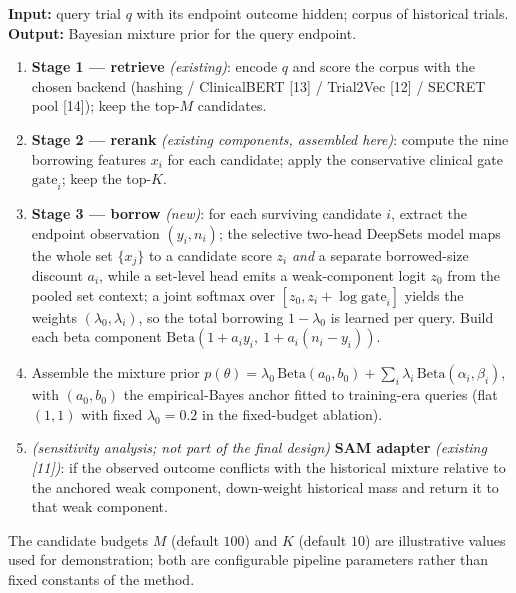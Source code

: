 \documentclass[11pt]{article}
\newcommand{\lamz}{\lambda_{0}}
\begin{document}
\begin{algorithm}[htbp]
\caption{Retrieve $\rightarrow$ rerank $\rightarrow$ borrow. Steps marked
(existing) reuse published tools; the step marked (new) is this paper's core
contribution.}
\label{alg:pipeline}
\small
\textbf{Input:} query trial $q$ with its endpoint outcome hidden; corpus of
historical trials. \quad
\textbf{Output:} Bayesian mixture prior for the query endpoint.
\begin{enumerate}[nosep,leftmargin=1.9em,label=\arabic*.]
\item \textbf{Stage 1 --- retrieve} \emph{(existing)}: encode $q$ and score the
corpus with the chosen backend (hashing / ClinicalBERT [13] / Trial2Vec [12] /
SECRET pool [14]); keep the top-$M$ candidates.
\item \textbf{Stage 2 --- rerank} \emph{(existing components, assembled here)}:
compute the nine borrowing features $x_i$ for each candidate; apply the
conservative clinical gate $\mathrm{gate}_i$; keep the top-$K$.
\item \textbf{Stage 3 --- borrow} \emph{(new)}: for each surviving candidate
$i$, extract the endpoint observation $(y_i, n_i)$; the selective two-head
DeepSets model maps the whole set $\{x_j\}$ to a candidate score $z_i$
\emph{and} a separate borrowed-size discount $a_i$, while a set-level head
emits a weak-component logit $z_0$ from the pooled set context; a joint
softmax over $[z_0, z_i + \log \mathrm{gate}_i]$ yields the weights
$(\lamz, \lambda_i)$, so the total borrowing $1-\lamz$ is learned per query.
Build each beta component $\mathrm{Beta}(1+a_i y_i,\ 1+a_i(n_i-y_i))$.
\item Assemble the mixture prior
$p(\theta) = \lamz\,\mathrm{Beta}(a_0,b_0) + \sum_i \lambda_i\,\mathrm{Beta}(\alpha_i,\beta_i)$,
with $(a_0,b_0)$ the empirical-Bayes anchor fitted to training-era queries
(flat $(1,1)$ with fixed $\lamz=0.2$ in the fixed-budget ablation).
\item \emph{(sensitivity analysis; not part of the final design)}
\textbf{SAM adapter} \emph{(existing [11])}: if the
observed outcome conflicts with the historical mixture relative to the anchored
weak component, down-weight historical mass and return it to that weak
component.
\end{enumerate}
\end{algorithm}

\noindent The candidate budgets $M$ (default $100$) and $K$ (default $10$) are
illustrative values used for demonstration; both are configurable pipeline
parameters rather than fixed constants of the method.
\end{document}
